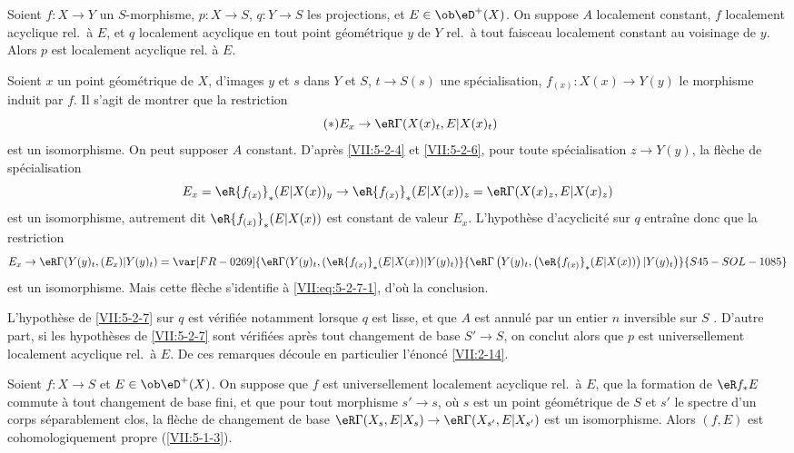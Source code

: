 \begin{corollary}\label{VII:5-2-7}
Soient $f:X\to Y$ un $S$-morphisme, $p:X\to S$, $q:Y\to S$ les projections, et 
$E\in\ob\eD^+(X)$. On suppose $A$ localement constant, $f$ localement acyclique 
rel.\ à $E$, et $q$ localement acyclique en tout point géométrique $y$ de 
$Y$ rel.\ à tout faisceau localement constant au voisinage de $y$. Alors $p$ 
est localement acyclique rel. à $E$. 
\end{corollary}

Soient $x$ un point géométrique de $X$, d'images $y$ et $s$ dans $Y$ et 
$S$, $t\to S(s)$ une spécialisation, $f_{(x)}:X(x)\to Y(y)$ le morphisme 
induit par $f$. Il s'agit de montrer que la restriction 
\begin{equation*}\tag{$*$}\label{VII:eq:5-2-7-1}
  E_x \to \eR\Gamma(X(x)_t,E|X(x)_t) 
\end{equation*}
est un isomorphisme. On peut supposer $A$ constant. D'après \ref{VII:5-2-4} et 
\ref{VII:5-2-6}, pour toute spécialisation $z\to Y(y)$, la flèche de 
spécialisation 
\[
  E_x = \eR {f_{(x)}}_\ast (E|X(x))_y \to \eR {f_{(x)}}_\ast (E|X(x))_z = \eR\Gamma(X(x)_z,E|X(x)_z) 
\]
est un isomorphisme, autrement dit $\eR{f_{(x)}}_\ast(E|X(x))$ est constant de 
valeur $E_x$. L'hypothèse d'acyclicité sur $q$ entra\^ine donc que la 
restriction 
\[
  E_x \to \eR\Gamma(Y(y)_t,(E_x)|Y(y)_t) = \var[FR-0269]{\eR\Gamma(Y(y)_t,(\eR {f_{(x)}}_\ast (E|X(x))|Y(y)_t)}{\eR\Gamma\left(Y(y)_t,\left(\eR {f_{(x)}}_\ast (E|X(x))\right)|Y(y)_t\right)}{S45-SOL-1085}
\]
est un isomorphisme. Mais cette flèche s'identifie à 
\eqref{VII:eq:5-2-7-1}, d'où la conclusion. 

L'hypothèse de \ref{VII:5-2-7} sur $q$ est vérifiée notamment lorsque $q$ 
est lisse, et que $A$ est annulé par un entier $n$ inversible sur $S$ 
. D'autre part, si les hypothèses de \ref{VII:5-2-7} sont 
vérifiées après tout changement de base $S'\to S$, on conclut alors que 
$p$ est universellement localement acyclique rel.\ à $E$. De ces remarques 
découle en particulier l'énoncé \ref{VII:2-14}. 





\begin{corollary}\label{VII:5-2-8}
Soient $f:X\to S$ et $E\in \ob\eD^+(X)$. On suppose que $f$ est universellement 
localement acyclique rel.\ à $E$, que la formation de $\eR f_\ast E$ commute 
à tout changement de base fini, et que pour tout morphisme $s'\to s$, où 
$s$ est un point géométrique de $S$ et $s'$ le spectre d'un corps 
séparablement clos, la flèche de changement de base 
$\eR\Gamma(X_s,E|X_s)\to \eR\Gamma(X_{s'},E|X_{s'})$ est un isomorphisme. 
Alors $(f,E)$ est cohomologiquement propre (\ref{VII:5-1-3}). 
\end{corollary}

